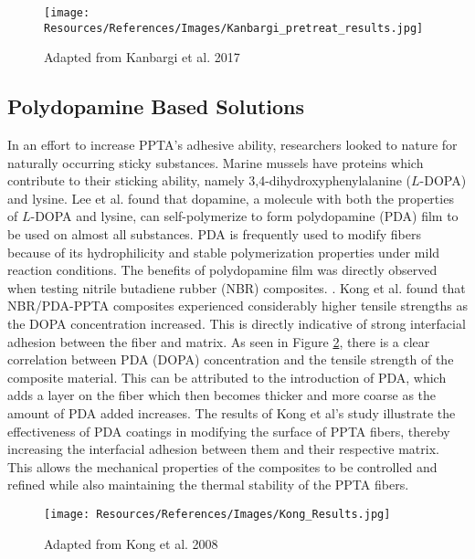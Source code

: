 \documentclass[12pt]{article}
\begin{document}
\begin{multicols}{2}
\vspace{5em}

\begin{figure}[H]
    \centering
    \texttt{[image: Resources/References/Images/Kanbargi\_pretreat\_results.jpg]}
    \caption{\scriptsize{Adapted from Kanbargi et al. 2017 \citep{Kanbargi2017}}}
    \label{fig:Kanbargi_Results}
\end{figure}

\subsection{Polydopamine Based Solutions}



\indent In an effort to increase PPTA's adhesive ability, researchers looked to nature for naturally occurring sticky substances. Marine mussels have proteins which contribute to their sticking ability, namely 3,4-dihydroxyphenylalanine ($L$-DOPA) and lysine. \citep{Waite2001} Lee et al. \citep{Lee2007} found that dopamine, a molecule with both the properties of $L$-DOPA and lysine, can self-polymerize to form polydopamine (PDA) film to be used on almost all substances. \citep{Yuan2017} PDA is frequently used to modify fibers because of its hydrophilicity and stable polymerization properties under mild reaction conditions. The benefits of polydopamine film was directly observed when testing nitrile butadiene rubber (NBR) composites. \citep{Kong2018}. Kong et al. \citep{Kong2018} found that NBR/PDA-PPTA composites experienced considerably higher tensile strengths as the DOPA concentration increased. This is directly indicative of strong interfacial adhesion between the fiber and matrix. As seen in Figure \ref{fig:Kong_Results}, there is a clear correlation between PDA (DOPA) concentration and the tensile strength of the composite material. This can be attributed to the introduction of PDA, which adds a layer on the fiber which then becomes thicker and more coarse as the amount of PDA added increases. The results of Kong et al's \citep{Kong2018} study illustrate the effectiveness of PDA coatings in modifying the surface of PPTA fibers, thereby increasing the interfacial adhesion between them and their respective matrix. This allows the mechanical properties of the composites to be controlled and refined while also maintaining the thermal stability of the PPTA fibers. 

\begin{figure}[H]
    \centering
    \texttt{[image: Resources/References/Images/Kong\_Results.jpg]}
    \caption{\scriptsize{Adapted from Kong et al. 2008 \citep{Kong2018}}}
    \label{fig:Kong_Results}
\end{figure}


\end{multicols}
\end{document}
